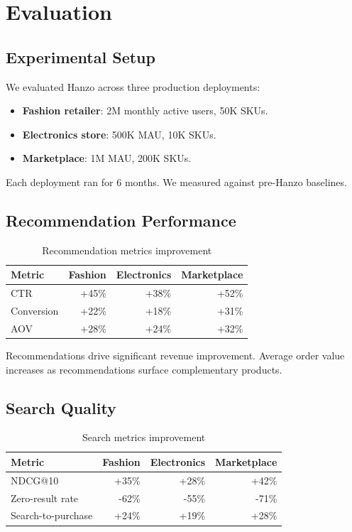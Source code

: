 \section{Evaluation}


\subsection{Experimental Setup}

We evaluated Hanzo across three production deployments:

\begin{itemize}
\item \textbf{Fashion retailer}: 2M monthly active users, 50K SKUs.
\item \textbf{Electronics store}: 500K MAU, 10K SKUs.
\item \textbf{Marketplace}: 1M MAU, 200K SKUs.
\end{itemize}

Each deployment ran for 6 months. We measured against pre-Hanzo baselines.

\subsection{Recommendation Performance}

\begin{table}[h]
\centering
\caption{Recommendation metrics improvement}
\label{tab:reco}
\begin{tabular}{lrrr}
\hline
Metric & Fashion & Electronics & Marketplace \\
\hline
CTR & +45\% & +38\% & +52\% \\
Conversion & +22\% & +18\% & +31\% \\
AOV & +28\% & +24\% & +32\% \\
\hline
\end{tabular}
\end{table}

Recommendations drive significant revenue improvement. Average order value increases as recommendations surface complementary products.

\subsection{Search Quality}

\begin{table}[h]
\centering
\caption{Search metrics improvement}
\label{tab:search}
\begin{tabular}{lrrr}
\hline
Metric & Fashion & Electronics & Marketplace \\
\hline
NDCG@10 & +35\% & +28\% & +42\% \\
Zero-result rate & -62\% & -55\% & -71\% \\
Search-to-purchase & +24\% & +19\% & +28\% \\
\hline
\end{tabular}
\end{table}


